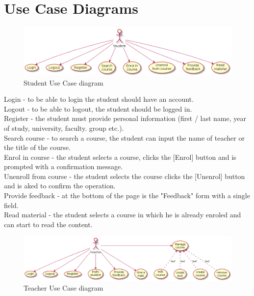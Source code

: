 \documentclass[12pt,a4paper,titlepage]{article}
\begin{document}
\section{Use Case Diagrams}

\begin{figure}[H]
\includegraphics[width=\textwidth]{student}
\caption{Student Use Case diagram}
\centering
\end{figure}

\noindent
Login - to be able to login the student should have an account.\\
Logout - to be able to logout, the student should be logged in.\\
Register - the student must provide personal information (first / last name, year of study, university, faculty. group etc.).\\
Search course - to search a course, the student can input the name of teacher or the title of the course.\\
Enrol in course - the student selects a course, clicks the [Enrol] button and is prompted with a confirmation message.\\
Unenroll from course - the student selects the course clicks the [Unenrol] button and is aked to confirm the operation.\\
Provide feedback - at the bottom of the page is the "Feedback" form with a single field.\\
Read material - the student selects a course in which he is already enroled and can start to read the content.

\clearpage

\begin{figure}[H]
\includegraphics[width=\textwidth]{teacher}
\caption{Teacher Use Case diagram}
\centering
\end{figure}
\end{document}
